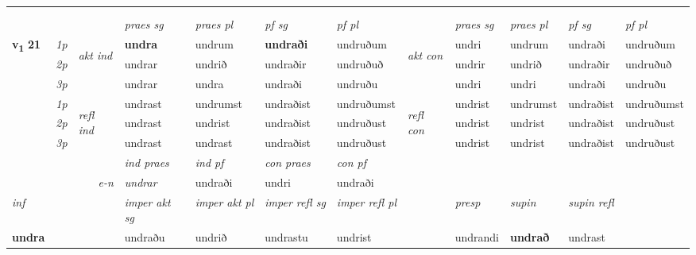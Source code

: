 \begin{longtable}[l]{X>{\footnotesize\itshape}llXXXXlXXXX}
& \\*
& \\
\midrule
 & &   & \textit{praes sg}  & \textit{praes pl}    & \textit{ pf sg} & \textit{pf pl} & & \textit{praes sg}  & \textit{praes pl}    & \textit{pf sg} & \textit{pf pl }  \\ \cmidrule{4-7} \cmidrule{9-12}
 \multirow{2}{*}{{{\textbf{v{\textsubscript{1}}} \Large{\textbf{21}}}}}  & 1p & \multirow{3}{*}{\begin{turn}{90}\textit{akt ind}\end{turn}} & \textbf{undra} & undrum & \textbf{undraði} & undruðum & \multirow{3}{*}{\begin{turn}{90}\textit{akt con}\end{turn}} &undri & undrum & undraði & undruðum\\*
 & 2p &  &  undrar  & undrið & undraðir & undruðuð & & undrir & undrið & undraðir & undruðuð \\*
 & 3p &  & undrar & undra & undraði & undruðu & & undri & undri& undraði & undruðu \\*
\cmidrule{4-7} \cmidrule{9-12}
 & 1p & \multirow{3}{*}{\begin{turn}{90}\textit{refl ind}\end{turn}}  & undrast & undrumst & undraðist & undruðumst & \multirow{3}{*}{\begin{turn}{90}\textit{refl con}\end{turn}}  &undrist & undrumst & undraðist & undruðumst \\*
 & 2p &  & undrast & undrist & undraðist & undruðust & &undrist & undrist & undraðist & undruðust \\*
 & 3p  & & undrast & undrast & undraðist & undruðust & & undrist & undrist& undraðist & undruðust \\*
\cmidrule{4-7} \cmidrule{9-12}

   && &  \textit{ind praes} & \textit{ind pf} & \textit{con praes} & \textit{con pf} \\*
\multicolumn{3}{r}{\textit{e-n}} & undrar & undraði & undri & undraði \\*

\cmidrule{4-7}
   {\textit{inf}} & &  & \textit{imper akt sg} & \textit{imper akt pl} & \textit{imper refl sg} & \textit{imper refl pl} && \textit{presp} & \textit{supin} & \textit{supin refl}  \\*
  {\textbf{undra}} & && undraðu  & undrið & undrastu & undrist && undrandi &  \textbf{undrað} & undrast  \\*


\end{longtable}
